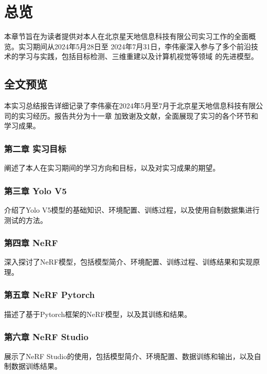 \documentclass{nwputhesis}
\begin{document}
\maketitle

\newpage
\makecontent

\maketext
\fancyfoot[C]{\thepage}
\pagestyle{fancy}
\section{总览}
本章节旨在为读者提供对本人在北京星天地信息科技有限公司实习工作的全面概览。实习期间从2024年5月28日至
2024年7月31日，李伟豪深入参与了多个前沿技术的学习与实践，包括目标检测、三维重建以及计算机视觉等领域
的先进模型。
\subsection{全文预览}
本实习总结报告详细记录了李伟豪在2024年5月至7月于北京星天地信息科技有限公司的实习经历。报告共分为十一章
加致谢及文献，全面展现了实习的各个环节和学习成果。
\subsubsection{第二章 实习目标}
阐述了本人在实习期间的学习方向和目标，以及对实习成果的期望。
\subsubsection{第三章 Yolo V5}
介绍了Yolo V5模型的基础知识、环境配置、训练过程，以及使用自制数据集进行测试的方法。
\subsubsection{第四章 NeRF}
深入探讨了NeRF模型，包括模型简介、环境配置、训练过程、训练结果和实现原理。
\subsubsection{第五章 NeRF Pytorch}
描述了基于Pytorch框架的NeRF模型，以及其训练和结果。
\subsubsection{第六章 NeRF Studio}
展示了NeRF Studio的使用，包括模型简介、环境配置、数据训练和输出，以及自制数据训练结果。
\end{document}
